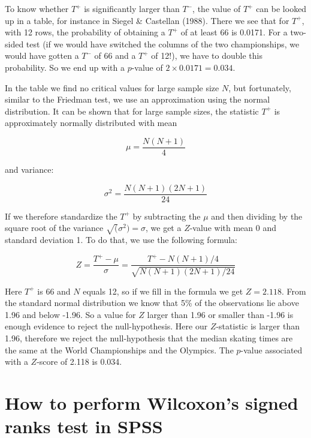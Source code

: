 \documentclass[]{book}\usepackage[]{graphicx}\usepackage[]{color}
\begin{document}
To know whether $T^+$ is significantly larger than $T^-$, the value of $T^+$ can be looked up in a table, for instance in Siegel \& Castellan (1988). There we see that for $T^+$, with 12 rows, the probability of obtaining a $T^+$ of at least 66 is 0.0171. For a two-sided test (if we would have switched the columns of the two championships, we would have gotten a $T^-$ of 66 and a $T^+$ of 12!), we have to double this probability. So we end up with a $p$-value of $2 \times 0.0171=0.034$.


In the table we find no critical values for large sample size $N$, but fortunately, similar to the Friedman test, we use an approximation using the normal distribution. It can be shown that for large sample sizes, the statistic $T^+$ is approximately normally distributed with mean


\begin{equation}
\mu = \frac{N(N+1)}{4}
\end{equation}

and variance:

\begin{equation}
\sigma^2= \frac {N(N+1)(2N+1)  }  {24}
\end{equation}


If we therefore standardize the $T^+$ by subtracting the $\mu$ and then dividing by the square root of the variance $\sqrt(\sigma^2)=\sigma$, we get a $Z$-value with mean 0 and standard deviation 1. To do that, we use the following formula:

\begin{equation}
Z = \frac{T^+ - \mu}{\sigma} =  \frac  { T^+ - N(N+1)/4} {\sqrt{N(N+1)(2N+1)/24}}
\end{equation}


Here $T^+$ is 66 and $N$ equals 12, so if we fill in the formula we get $Z= 2.118$. From the standard normal distribution we know that 5\% of the observations lie above 1.96 and below -1.96. So a value for $Z$ larger than 1.96 or smaller than -1.96 is enough evidence to reject the null-hypothesis. Here our $Z$-statistic is larger than 1.96, therefore we reject the null-hypothesis that the median skating times are the same at the World Championships and the Olympics. The $p$-value associated with a $Z$-score of 2.118 is 0.034.





\section{How to perform Wilcoxon's signed ranks test in SPSS}
\end{document}
